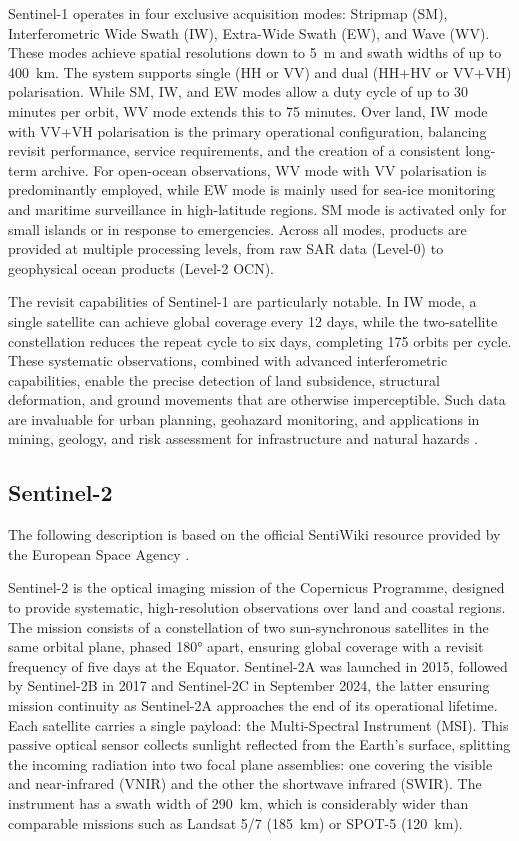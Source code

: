 Sentinel-1 operates in four exclusive acquisition modes: Stripmap (SM), Interferometric Wide Swath (IW), Extra-Wide Swath (EW), and Wave (WV). These modes achieve spatial resolutions down to 5~m and swath widths of up to 400~km. The system supports single (HH or VV) and dual (HH+HV or VV+VH) polarisation. While SM, IW, and EW modes allow a duty cycle of up to 30 minutes per orbit, WV mode extends this to 75 minutes. Over land, IW mode with VV+VH polarisation is the primary operational configuration, balancing revisit performance, service requirements, and the creation of a consistent long-term archive. For open-ocean observations, WV mode with VV polarisation is predominantly employed, while EW mode is mainly used for sea-ice monitoring and maritime surveillance in high-latitude regions. SM mode is activated only for small islands or in response to emergencies. Across all modes, products are provided at multiple processing levels, from raw SAR data (Level-0) to geophysical ocean products (Level-2 OCN).  

The revisit capabilities of Sentinel-1 are particularly notable. In IW mode, a single satellite can achieve global coverage every 12 days, while the two-satellite constellation reduces the repeat cycle to six days, completing 175 orbits per cycle. These systematic observations, combined with advanced interferometric capabilities, enable the precise detection of land subsidence, structural deformation, and ground movements that are otherwise imperceptible. Such data are invaluable for urban planning, geohazard monitoring, and applications in mining, geology, and risk assessment for infrastructure and natural hazards \cite{sentiwiki}.  



\subsection{Sentinel-2}
The following description is based on the official SentiWiki resource provided by the European Space Agency \cite{sentiwiki}. 

Sentinel-2 is the optical imaging mission of the Copernicus Programme, designed to provide systematic, high-resolution observations over land and coastal regions. The mission consists of a constellation of two sun-synchronous satellites in the same orbital plane, phased 180° apart, ensuring global coverage with a revisit frequency of five days at the Equator. Sentinel-2A was launched in 2015, followed by Sentinel-2B in 2017 and Sentinel-2C in September 2024, the latter ensuring mission continuity as Sentinel-2A approaches the end of its operational lifetime.  
Each satellite carries a single payload: the Multi-Spectral Instrument (MSI). This passive optical sensor collects sunlight reflected from the Earth’s surface, splitting the incoming radiation into two focal plane assemblies: one covering the visible and near-infrared (VNIR) and the other the shortwave infrared (SWIR). The instrument has a swath width of 290~km, which is considerably wider than comparable missions such as Landsat 5/7 (185~km) or SPOT-5 (120~km).  

